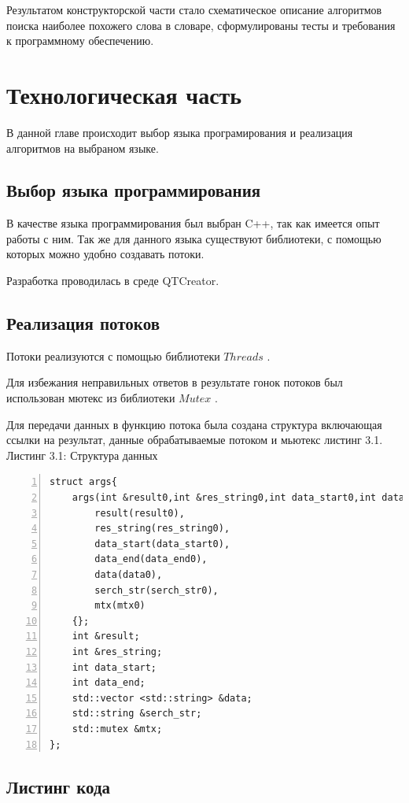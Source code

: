 \documentclass[12pt,a4paper]{report}
\begin{document}
Результатом конструкторской части стало схематическое описание алгоритмов поиска наиболее похожего слова в словаре, сформулированы тесты и требования к программному обеспечению.

\newpage
\chapter{Технологическая часть} 
В данной главе происходит выбор языка програмирования и реализация алгоритмов на выбраном языке.
\section{Выбор языка программирования}

В качестве языка программирования был выбран C++, так как имеется опыт работы с ним. Так же для данного языка существуют  
библиотеки, с помощью которых можно удобно создавать потоки. 
 
Разработка проводилась в среде QTCreator.
\section{Реализация потоков}
Потоки реализуются с помощью библиотеки $Threads$ \cite{cpp_info}.

Для избежания неправильных ответов в результате гонок потоков был использован мютекс из библиотеки $Mutex$ \cite{new}.

Для передачи данных в функцию потока была создана структура включающая ссылки на результат, данные обрабатываемые потоком и мьютекс листинг 3.1.
\newpage
\textrm{Листинг 3.1: Структура данных}
\begin{lstlisting}[frame=single, numbers=left]
struct args{
    args(int &result0,int &res_string0,int data_start0,int data_end0,std::vector <std::string> &data0,std::string &serch_str0,std::mutex &mtx0):
        result(result0),
        res_string(res_string0),
        data_start(data_start0),
        data_end(data_end0),
        data(data0),
        serch_str(serch_str0),
        mtx(mtx0)
    {};
    int &result;
    int &res_string;
    int data_start;
    int data_end;
    std::vector <std::string> &data;
    std::string &serch_str;
    std::mutex &mtx;
};
\end{lstlisting}
\section{Листинг кода}
\end{document}
